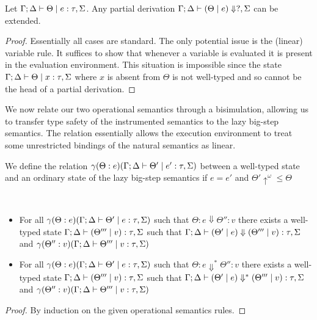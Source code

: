 \documentclass[acmsmall,review,anonymous,screen]{acmart}
\begin{document}
\begin{theorem}[Progress]\label{thm:prog}
Let $\Gamma ; \Delta \vdash \Theta \mid e : \tau,\Sigma$. Any partial derivation $\Gamma; \Delta \vdash (\Theta \mid e)
\Downarrow?,\Sigma$ can be extended. 
\end{theorem}

\begin{proof}
 Essentially all cases are standard. The only potential issue is the
 (linear) variable rule.
It suffices to show that whenever a variable is evaluated it is
present in the evaluation environment. This situation is impossible
since the state
$\Gamma ; \Delta \vdash \Theta \mid x : \tau , \Sigma$ where $x$ is absent
from $\Theta$ is not well-typed and so cannot be the head of a partial
derivation. 
\end{proof}


We now relate our two operational semantics through a bisimulation,
allowing us to transfer type safety of the instrumented semantics to
the lazy big-step semantics. The relation essentially allows the
execution environment to treat some unrestricted bindings
of the natural semantics as linear.

\begin{definition}[Bisimulation]
We define the relation $\gamma(\Theta : e)(\Gamma ; \Delta \vdash \Theta' \mid
e' : \tau,\Sigma)$ between a well-typed state and an ordinary state of
the lazy big-step semantics if $e = e'$ and $\Theta'{\uparrow^\omega}
\leq \Theta$
\end{definition}

\begin{lemma}~\label{lem:naturaltoinstr}
  \begin{itemize}
    \item For all $\gamma(\Theta : e)(\Gamma ; \Delta \vdash \Theta' \mid
e : \tau,\Sigma)$ such that $\Theta : e \Downarrow \Theta'' : v$
there exists a well-typed state $\Gamma ; \Delta \vdash (\Theta''' \mid v) :
\tau,\Sigma$ such that $\Gamma ; \Delta \vdash (\Theta' \mid e) \Downarrow
(\Theta''' \mid v) : \tau,\Sigma$ and $\gamma(\Theta'' : v)(\Gamma ; \Delta
\vdash \Theta''' \mid v : \tau,\Sigma)$
\item For all $\gamma(\Theta : e)(\Gamma ; \Delta \vdash \Theta' \mid
e : \tau,\Sigma)$ such that $\Theta : e \Downarrow^* \Theta'' : v$
there exists a well-typed state $\Gamma ; \Delta \vdash (\Theta''' \mid v) :
\tau,\Sigma$ such that $\Gamma ; \Delta \vdash (\Theta' \mid e) \Downarrow^*
(\Theta''' \mid v) : \tau,\Sigma$ and $\gamma(\Theta'' : v)(\Gamma ; \Delta
\vdash \Theta''' \mid v : \tau,\Sigma)$
\end{itemize}
\end{lemma}
\begin{proof}
By induction on the given operational semantics rules.
  \end{proof}
\end{document}
